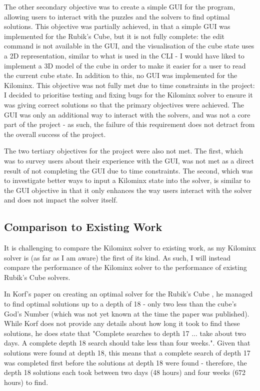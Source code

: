 The other secondary objective was to create a simple GUI for the program, allowing users to interact with the puzzles and the solvers to find optimal solutions. This objective was partially achieved, in that a simple GUI was implemented for the Rubik's Cube, but it is not fully complete: the edit command is not available in the GUI, and the visualisation of the cube state uses a 2D representation, similar to what is used in the CLI - I would have liked to implement a 3D model of the cube in order to make it easier for a user to read the current cube state. In addition to this, no GUI was implemented for the Kilominx. This objective was not fully met due to time constraints in the project: I decided to prioritise testing and fixing bugs for the Kilominx solver to ensure it was giving correct solutions so that the primary objectives were achieved. The GUI was only an additional way to interact with the solvers, and was not a core part of the project - as such, the failure of this requirement does not detract from the overall success of the project.

The two tertiary objectives for the project were also not met. The first, which was to survey users about their experience with the GUI, was not met as a direct result of not completing the GUI due to time constraints. The second, which was to investigate better ways to input a Kilominx state into the solver, is similar to the GUI objective in that it only enhances the way users interact with the solver and does not impact the solver itself.

\subsection{Comparison to Existing Work}
It is challenging to compare the Kilominx solver to existing work, as my Kilominx solver is (as far as I am aware) the first of its kind. As such, I will instead compare the performance of the Kilominx solver to the performance of existing Rubik's Cube solvers.

In Korf's paper on creating an optimal solver for the Rubik's Cube \cite{korf}, he managed to find optimal solutions up to a depth of 18 - only two less than the cube's God's Number (which was not yet known at the time the paper was published). While Korf does not provide any details about how long it took to find these solutions, he does state that "Complete searches to depth 17 ... take about two days. A complete depth 18 search should take less than four weeks.". Given that solutions were found at depth 18, this means that a complete search of depth 17 was completed first before the solutions at depth 18 were found - therefore, the depth 18 solutions each took between two days (48 hours) and four weeks (672 hours) to find.

